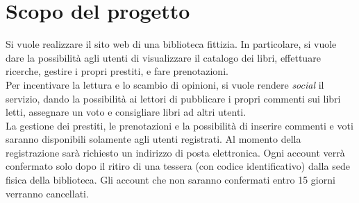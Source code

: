 \section{Scopo del progetto}
Si vuole realizzare il sito web di una biblioteca fittizia. In particolare, si vuole dare la possibilità agli utenti di visualizzare il catalogo dei libri, effettuare ricerche, gestire i propri prestiti, e fare prenotazioni.\\
Per incentivare la lettura e lo scambio di opinioni, si vuole rendere \textit{social} il servizio, dando la possibilità ai lettori di pubblicare i propri commenti sui libri letti, assegnare un voto e consigliare libri ad altri utenti.\\
La gestione dei prestiti, le prenotazioni e la possibilità di inserire commenti e voti saranno disponibili solamente agli utenti registrati. Al momento della registrazione sarà richiesto un indirizzo di posta elettronica. Ogni account verrà confermato solo dopo il ritiro di una tessera (con codice identificativo) dalla sede fisica della biblioteca. Gli account che non saranno confermati entro 15 giorni verranno cancellati. 

\newpage